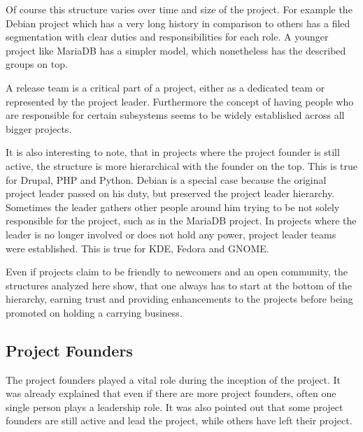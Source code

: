 Of course this structure varies over time and size of the project. For example
the Debian project which has a very long history in comparison to others has a
filed segmentation with clear duties and responsibilities for each role. A
younger project like MariaDB has a simpler model, which nonetheless has the
described groups on top.

A release team is a critical part of a project, either as a dedicated team or
represented by the project leader. Furthermore the concept of having people who
are responsible for certain subsystems seems to be widely established across
all bigger projects.

It is also interesting to note, that in projects where the project founder is
still active, the structure is more hierarchical with the founder on the top.
This is true for Drupal, PHP and Python. Debian is a special case because the
original project leader passed on his duty, but preserved the project leader
hierarchy. Sometimes the leader gathers other people around him trying to be
not solely responsible for the project, such as in the MariaDB project. In
projects where the leader is no longer involved or does not hold any power,
project leader teams were established. This is true for KDE, Fedora and GNOME.

Even if projects claim to be friendly to newcomers and an open community, the
structures analyzed here show, that one always has to start at the bottom of
the hierarchy, earning trust and providing enhancements to the projects before
being promoted on holding a carrying business. 


\subsection{Project Founders} %

The project founders played a vital role during the inception of the project. It
was already explained that even if there are more project founders, often one
single person plays a leadership role. It was also pointed out that some
project founders are still active and lead the project, while others have left
their project.

